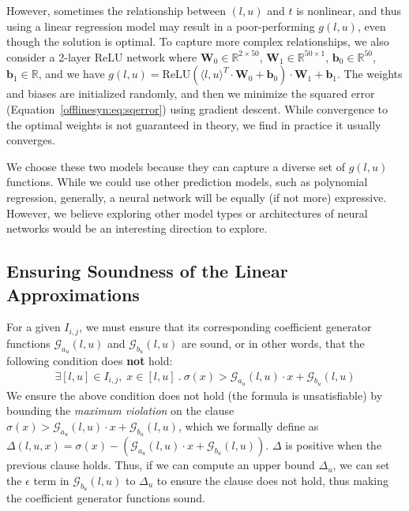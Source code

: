 However, sometimes the relationship between $ (l, u) $ and $ t $ is nonlinear,
and thus using a linear regression model may result in a poor-performing $ g(l,
u) $, even though the solution is optimal. To capture more complex
relationships, we also consider a 2-layer ReLU network where $
\mathbf{W}_0 \in \mathbb{R}^{2\times50} $, $ \mathbf{W}_1 \in
\mathbb{R}^{50\times1} $, $ \mathbf{b}_0 \in \mathbb{R}^{50} $, $ \mathbf{b}_1
\in \mathbb{R} $, and we have $ g(l, u) = \text{ReLU}(\langle l,u \rangle^T
\cdot \mathbf{W}_0 + \mathbf{b}_0) \cdot \mathbf{W}_1 + \mathbf{b}_1 $. The
weights and biases are initialized randomly, and then we minimize the
squared error (Equation~\ref{offlinesyn:eq:sqerror}) using gradient
descent. While convergence to the optimal weights is not guaranteed in
theory, we find in practice it usually converges.

We choose these two models because they can capture a diverse set of $ g(l , u) $ functions. While
we could use other prediction models, such as polynomial regression, generally, a neural
network will be equally (if not more) expressive. However, we believe exploring
other model types or architectures of neural networks would be an interesting
direction to explore.



\subsection{Ensuring Soundness of the Linear
Approximations}\label{offlinesyn:sec:soundness}
For a given $ I_{i, j} $, we must ensure that its corresponding coefficient
generator functions $ \mathcal{G}_{a_u}(l ,u)$ and $ \mathcal{G}_{b_u}(l ,u) $
are sound, or in other
words, that the following condition does \textbf{not} hold:
\begin{gather*}\label{offlinesyn:eq:sound-opt}
\exists [l, u] \in I_{i, j}, \; x \in [l, u] ~.~
\sigma(x) > \mathcal{G}_{a_u}(l, u)\cdot x + \mathcal{G}_{b_u}(l, u)
\end{gather*}
We ensure the above condition does not hold (the formula is unsatisfiable) by bounding the \textit{maximum violation} on
the clause $ \sigma(x) > \mathcal{G}_{a_u}(l, u)\cdot x + \mathcal{G}_{b_u}(l,
u) $,
which we formally define as
$ \Delta(l, u, x) =  \sigma(x) - (\mathcal{G}_{a_u}(l, u)\cdot x +
\mathcal{G}_{b_u}(l, u)) $. $ \Delta $ is
positive when the previous clause holds.  Thus, if we can compute an upper bound
$ \Delta_u $, we can set the $ \epsilon $ term in $ \mathcal{G}_{b_u}(l, u) $
to $ \Delta_u $
to ensure the clause does not hold, thus making the coefficient generator functions sound.

